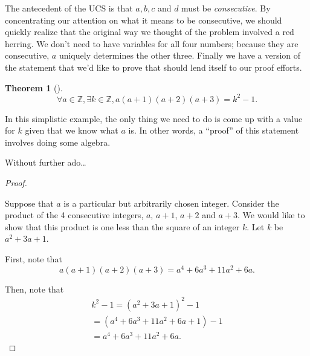 \documentclass[10pt,]{book}
\theoremstyle{plain}
\newtheorem{theorem}{Theorem}[section]
\theoremstyle{definition}
\theoremstyle{definition}
\numberwithin{equation}{section}
\newcommand{\Integers}{{\mathbb Z}}
\begin{document}
    The antecedent of the UCS is that \(a,b,c\) and \(d\) must be
    \emph{consecutive}. By concentrating our attention on what it
    means to be consecutive, we should quickly realize that the original
    way we thought of the problem involved a red herring. We don't need
    to have variables for all four numbers; because they are consecutive,
    \(a\) uniquely determines the other three. Finally we have a version
    of the statement that we'd like to prove that should lend itself
    to our proof efforts.
\begin{theorem}[{}]\label{theorem-5}
\begin{equation*}
        \forall a \in \Integers, \exists k \in \Integers, 
        a(a+1)(a+2)(a+3) = k^2 - 1.
      \end{equation*}\end{theorem}
\par

    In this simplistic example, the only thing we need to do is come
    up with a value for \(k\) given that we know what \(a\) is. In other
    words, a ``proof'' of this statement involves doing some algebra.
\par

    Without further ado\dots{}
\begin{proof}\hypertarget{proof-7}{}

      Suppose that \(a\) is a particular but arbitrarily chosen
      integer. Consider the product of the 4 consecutive integers, \(a\),
      \(a+1\), \(a+2\) and \(a+3\). We would like to show that this product is
      one less than the square of an integer \(k\). Let \(k\) be \(a^2+3a+1\).
\par

      First, note that
      \begin{equation*}
        a(a+1)(a+2)(a+3) = a^4 + 6a^3 + 11a^2 + 6a.
      \end{equation*}
\par

      Then, note that
      \begin{gather*}
k^2 - 1 = (a^2 + 3a +1)^2 - 1\\
= (a^4  + 6a^3 + 11a^2 + 6a + 1) - 1\\
= a^4 + 6a^3 + 11a^2 + 6a.
\end{gather*}
\end{proof}
\par
\end{document}
